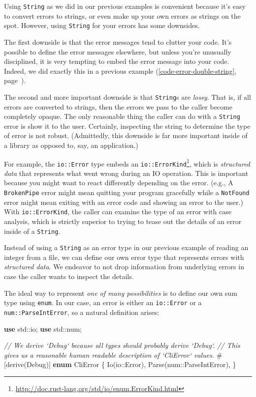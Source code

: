 \documentclass[a4paper,]{book}
\renewcommand*{\hyperref}[2][\ar]{%
  \def\ar{#2}%
  #2 (\autoref{#1}, page~\pageref{#1})}
\newenvironment{Shaded}{\begin{snugshade}}{\end{snugshade}}
\newcommand{\KeywordTok}[1]{\textcolor[rgb]{0.13,0.29,0.53}{\textbf{{#1}}}}
\newcommand{\CommentTok}[1]{\textcolor[rgb]{0.56,0.35,0.01}{\textit{{#1}}}}
\newcommand{\BuiltInTok}[1]{{#1}}
\newcommand{\AttributeTok}[1]{\textcolor[rgb]{0.77,0.63,0.00}{{#1}}}
\newcommand{\NormalTok}[1]{{#1}}
\renewcommand{\href}[2]{#2\footnote{\url{#1}}}
\begin{document}
Using \texttt{String} as we did in our previous examples is convenient
because it's easy to convert errors to strings, or even make up your own
errors as strings on the spot. However, using \texttt{String} for your
errors has some downsides.

The first downside is that the error messages tend to clutter your code.
It's possible to define the error messages elsewhere, but unless you're
unusually disciplined, it is very tempting to embed the error message
into your code. Indeed, we did exactly this in a
\hyperref[code-error-double-string]{previous example}.

The second and more important downside is that \texttt{String}s are
\emph{lossy}. That is, if all errors are converted to strings, then the
errors we pass to the caller become completely opaque. The only
reasonable thing the caller can do with a \texttt{String} error is show
it to the user. Certainly, inspecting the string to determine the type
of error is not robust. (Admittedly, this downside is far more important
inside of a library as opposed to, say, an application.)

For example, the \texttt{io::Error} type embeds an
\href{http://doc.rust-lang.org/std/io/enum.ErrorKind.html}{\texttt{io::ErrorKind}},
which is \emph{structured data} that represents what went wrong during
an IO operation. This is important because you might want to react
differently depending on the error. (e.g., A \texttt{BrokenPipe} error
might mean quitting your program gracefully while a \texttt{NotFound}
error might mean exiting with an error code and showing an error to the
user.) With \texttt{io::ErrorKind}, the caller can examine the type of
an error with case analysis, which is strictly superior to trying to
tease out the details of an error inside of a \texttt{String}.

Instead of using a \texttt{String} as an error type in our previous
example of reading an integer from a file, we can define our own error
type that represents errors with \emph{structured data}. We endeavor to
not drop information from underlying errors in case the caller wants to
inspect the details.

The ideal way to represent \emph{one of many possibilities} is to define
our own sum type using \texttt{enum}. In our case, an error is either an
\texttt{io::Error} or a \texttt{num::ParseIntError}, so a natural
definition arises:

\begin{Shaded}
\begin{Highlighting}[]
\KeywordTok{use} \NormalTok{std::io;}
\KeywordTok{use} \NormalTok{std::num;}

\CommentTok{// We derive `Debug` because all types should probably derive `Debug`.}
\CommentTok{// This gives us a reasonable human readable description of `CliError` values.}
\AttributeTok{#[}\NormalTok{derive}\AttributeTok{(}\BuiltInTok{Debug}\AttributeTok{)]}
\KeywordTok{enum} \NormalTok{CliError \{}
    \NormalTok{Io(io::Error),}
    \NormalTok{Parse(num::ParseIntError),}
\NormalTok{\}}
\end{Highlighting}
\end{Shaded}
\end{document}
